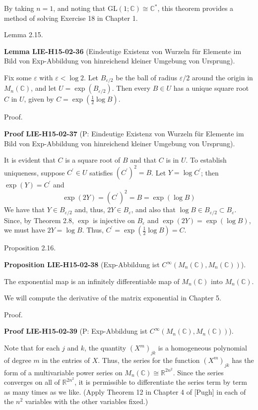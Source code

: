 \documentclass[10pt, letterpaper]{article}
\newcommand{\C}{\mathbb{C}}
\newcommand{\CustomHeading}[3]{%
  \par\medskip\noindent%
  \textbf{#1 #2} \textnormal{(#3)}.\enskip%
}
\newenvironment{PROP}[2]{\begin{unitbox}\CustomHeading{Proposition}{#1}{#2}}{\end{unitbox}}
\newenvironment{LEM}[2]{\begin{unitbox}\CustomHeading{Lemma}{#1}{#2}}{\end{unitbox}}
\newenvironment{PROOF}[2]{\begin{unitbox}\CustomHeading{Proof}{#1}{#2}}{\end{unitbox}}
\begin{document}
By taking $n=1$, and noting that $\mathrm{GL}(1 ; \mathbb{C}) \cong \mathbb{C}^{*}$, this theorem provides a method of solving Exercise 18 in Chapter 1.

Lemma 2.15. 


\begin{LEM}{LIE-H15-02-36}{Eindeutige Existenz von Wurzeln für Elemente im Bild von Exp-Abbildung von hinreichend kleiner Umgebung von Ursprung}
Fix some $\varepsilon$ with $\varepsilon<\log 2$. Let $B_{\varepsilon / 2}$ be the ball of radius $\varepsilon / 2$ around the origin in $M_{n}(\mathbb{C})$, and let $U=\exp \left(B_{\varepsilon / 2}\right)$. Then every $B \in U$ has a unique square root $C$ in $U$, given by $C=\exp \left(\frac{1}{2} \log B\right)$.
\end{LEM}

Proof. 

\begin{PROOF}{LIE-H15-02-37}{P: Eindeutige Existenz von Wurzeln für Elemente im Bild von Exp-Abbildung von hinreichend kleiner Umgebung von Ursprung}
It is evident that $C$ is a square root of $B$ and that $C$ is in $U$. To establish uniqueness, suppose $C^{\prime} \in U$ satisfies $\left(C^{\prime}\right)^{2}=B$. Let $Y=\log C^{\prime}$; then $\exp (Y)= C^{\prime}$ and
$$
\exp (2 Y)=\left(C^{\prime}\right)^{2}=B=\exp (\log B)
$$
We have that $Y \in B_{\varepsilon / 2}$ and, thus, $2 Y \in B_{\varepsilon}$, and also that $\log B \in B_{\varepsilon / 2} \subset B_{\varepsilon}$. Since, by Theorem 2.8, $\exp$ is injective on $B_{\varepsilon}$ and $\exp (2 Y)=\exp (\log B)$, we must have $2 Y=\log B$. Thus, $C^{\prime}=\exp \left(\frac{1}{2} \log B\right)=C$.
\end{PROOF}



Proposition 2.16. 

\begin{PROP}{LIE-H15-02-38}{Exp-Abbildung ist $C^\infty(M_n(\C),M_n(\C))$}
The exponential map is an infinitely differentiable map of $M_{n}(\mathbb{C})$ into $M_{n}(\mathbb{C})$.
\end{PROP}

We will compute the derivative of the matrix exponential in Chapter 5.


Proof. 

\begin{PROOF}{LIE-H15-02-39}{P: Exp-Abbildung ist $C^\infty(M_n(\C),M_n(\C))$}
Note that for each $j$ and $k$, the quantity $\left(X^{m}\right)_{j k}$ is a homogeneous polynomial of degree $m$ in the entries of $X$. Thus, the series for the function $\left(X^{m}\right)_{j k}$ has the form of a multivariable power series on $M_{n}(\mathbb{C}) \cong \mathbb{R}^{2 n^{2}}$. Since the series converges on all of $\mathbb{R}^{2 n^{2}}$, it is permissible to differentiate the series term by term as many times as we like. (Apply Theorem 12 in Chapter 4 of [Pugh] in each of the $n^{2}$ variables with the other variables fixed.)
\end{PROOF}
\end{document}
